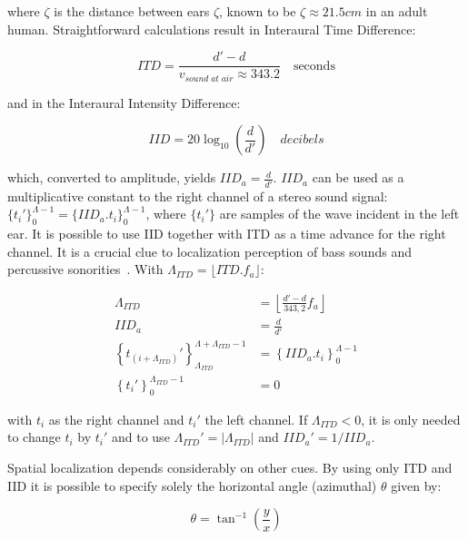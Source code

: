 \noindent where $\zeta$ is the distance between ears $\zeta$, known to be $\zeta \approx 21.5cm$ in an adult human. Straightforward calculations result in Interaural Time Difference:

\begin{equation}\label{eq:dti}
ITD=\frac{d'-d}{v_{sound\;at\;air}\approx 343.2 }\quad \text{seconds}
\end{equation}

\noindent and in the Interaural Intensity Difference:

\begin{equation}\label{eq:dii}
IID=20\log_{10}\left (\frac{d}{d'}\right) \quad decibels
\end{equation}

\noindent which, converted to amplitude, yields $IID_a=\frac{d}{d'}$. $IID_a$ can be used as a multiplicative constant to the right channel of a stereo sound signal: $\{t_i'\}_0^{\Lambda -1}=\{IID_a . t_i\}_0^{\Lambda -1}$, where $\{t_i'\}$ are samples of the wave incident in the left ear. It is possible to use IID together with ITD as a time advance for the right channel. It is a crucial clue to localization perception of bass sounds and percussive sonorities~\cite{Heeger}. 
With $\Lambda_{ITD}=\lfloor ITD . f_a \rfloor$:

\begin{equation}\label{eq:locImpl}
\begin{split}
\Lambda_{ITD} & = \left \lfloor \frac{d'-d}{343,2}  f_a \right \rfloor \\
IID_a & = \frac{d}{d'} \\
\left\{t_{(i+\Lambda_{ITD})}'\right\}_{\Lambda_{ITD}}^{\Lambda+\Lambda_{ITD}-1} & =\left\{IID_a . t_i\right\}_0^{\Lambda-1} \\
\left\{t_i'\right\}_0^{\Lambda_{ITD}-1} & = 0
\end{split}
\end{equation}

\noindent with $t_i$ as the right channel and $t_i'$ the left channel. If $\Lambda_{ITD} < 0 $, it is only needed to change $t_i$ by $t_i'$ and to use $\Lambda_{ITD}'= | \Lambda_{ITD} | $ and $IID_a'=1 / IID_a$.

Spatial localization depends considerably on other cues. By using only ITD and IID it is possible to specify solely the horizontal angle (azimuthal) $\theta$ given by:

\begin{equation}\label{eq:angulo}
\theta=\tan^{-1}\left ( \frac{y}{ x }  \right )
\end{equation}

